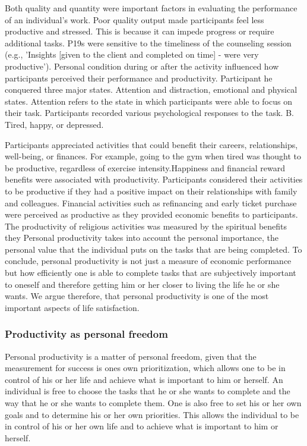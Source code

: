 Both quality and quantity were important factors in evaluating the performance of an individual's work. Poor quality output  made participants feel less productive and stressed. This is because it can impede progress or require additional tasks. P19s were sensitive to the timeliness of the counseling session (e.g., 'Insights [given to the client and completed on time] - were very productive'). Personal condition during or after the activity influenced how participants perceived their performance and productivity. Participant he conquered three major states.
Attention and distraction, emotional  and physical states. Attention refers to the state in which participants were able to focus on their task. Participants recorded various psychological responses to the task. B. Tired, happy, or depressed.

Participants appreciated activities that could benefit their careers, relationships, well-being, or finances. For example, going to the gym  when tired was thought to be productive, regardless of exercise intensity.Happiness and financial reward benefits were associated with productivity. Participants considered their activities to be productive if they had a positive impact on their relationships with family and colleagues. Financial activities such as refinancing and early ticket purchase were perceived as productive as they provided economic benefits to participants. The productivity of religious activities was measured by the spiritual benefits they
Personal productivity takes into account the personal importance, the personal value that the individual puts on the tasks that are
being completed.
To  conclude, personal productivity is not just a measure of economic performance but how efficiently one is able to complete tasks that are subjectively important to oneself and therefore getting him or her closer to living the life he or she wants. We argue therefore, that personal productivity is one of the most important aspects of life satisfaction.

\subsubsection{Productivity as personal freedom}
Personal productivity is a matter of personal freedom, given that the measurement for success is ones own prioritization, which allows one to be in control of his or her life and achieve what is important to him or herself.
An individual is free to choose the tasks that he or she wants to complete and the way that he or she wants to complete them.  One is also free to set his or her own goals and to determine his or her own priorities. This allows the individual to be in control of his or her own life and to achieve what is important to him or herself.

